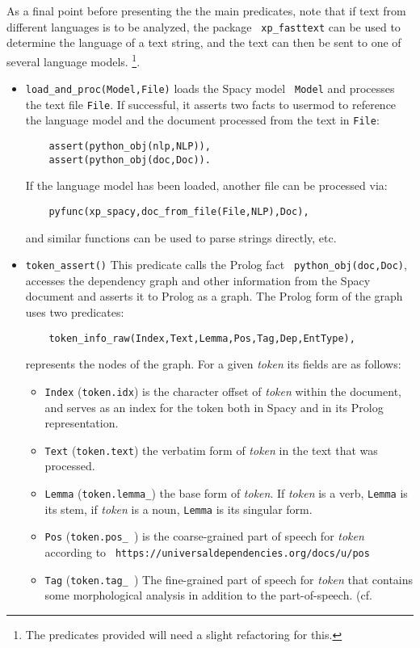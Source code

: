 As a final point before presenting the the main predicates, note that
if text from different languages is to be analyzed, the package {\tt
  xp\_fasttext} can be used to determine the language of a text
string, and the text can then be sent to one of several language
models. \footnote{The predicates provided will need a slight
  refactoring for this.}.

\begin{itemize}
\item {\tt load\_and\_proc(Model,File)} loads the Spacy model {\tt
  Model} and processes the text file {\tt File}.  If successful, it
  asserts two facts to usermod to reference the language model and the
  document processed from the text in {\tt File}:
\begin{verbatim}  
    assert(python_obj(nlp,NLP)),
    assert(python_obj(doc,Doc)).
\end{verbatim}

If the language model has been loaded, another file can be processed via:
\begin{verbatim}
    pyfunc(xp_spacy,doc_from_file(File,NLP),Doc),                              
\end{verbatim}
and similar functions can be used to parse strings directly, etc.

\item {\tt token\_assert()} This predicate calls the Prolog fact {\tt
  python\_obj(doc,Doc)}, accesses the dependency graph and other
  information from the Spacy document and asserts it to Prolog as a
  graph.  The Prolog form of the graph uses two predicates:
\begin{verbatim}  
    token_info_raw(Index,Text,Lemma,Pos,Tag,Dep,EntType),
\end{verbatim}
represents the nodes of the graph.  For a given {\em token} its fields
are as follows:
\begin{itemize}
  \item {\tt Index} ({\tt token.idx}) is the character offset of {\em
    token} within the document, and serves as an index for the token
    both in Spacy and in its Prolog representation.
  \item {\tt Text} ({\tt token.text}) the verbatim form of {\em token}
    in the text that was processed.
  \item {\tt Lemma} ({\tt token.lemma\_}) the base form of {\em
    token}.  If {\em token} is a verb, {\tt Lemma} is its stem, if
    {\em token} is a noun, {\tt Lemma} is its singular form.
  \item {\tt Pos} ({\tt token.pos\_ }) is the coarse-grained part of
    speech for {\em token} according to {\tt
      https://universaldependencies.org/docs/u/pos}
  \item {\tt Tag} ({\tt token.tag\_ }) The fine-grained part of speech
    for {\em token} that contains some morphological analysis in
    addition to the part-of-speech.
    (cf.


\end{itemize}
\end{itemize}
